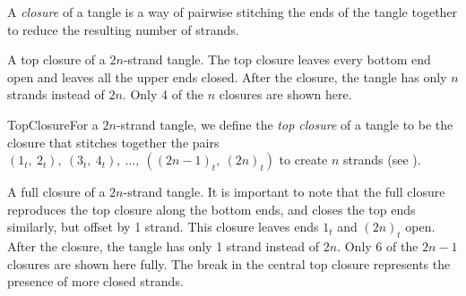 \begin{paper}
A \textit{closure} of a tangle is a way of pairwise stitching the ends of the
tangle together to reduce the resulting number of strands.

{A top closure of a $2n$-strand tangle.
The top closure leaves every bottom end open and leaves all the upper ends
closed.
After the closure, the tangle has only $n$ strands instead of $2n$.
Only 4 of the $n$ closures are shown here.}

\begin{paperdef}{TopClosure}{For a $2n$-strand tangle, we define the
\textit{top closure} of a tangle to be the closure that stitches together the
pairs $(1_t,~2_t),~(3_t,~4_t),~\dots,~((2n-1)_t,~(2n)_t)$ to create
$n$ strands (see \figTop).}\end{paperdef}

{A full closure of a $2n$-strand tangle.
It is important to note that the full closure reproduces the top closure along
the bottom ends, and closes the top ends similarly, but offset by 1 strand.
This closure leaves ends $1_t$ and $(2n)_t$ open.
After the closure, the tangle has only 1 strand instead of $2n$.
Only 6 of the $2n-1$ closures are shown here fully.
The break in the central top closure represents the presence of more closed
strands.}


\end{paper}
